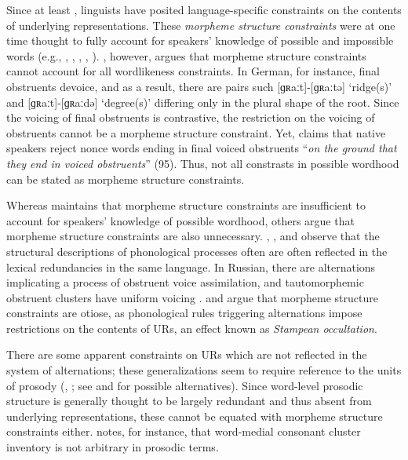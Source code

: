 \label{gaps} 


Since at least \citet{Pike1947b}, linguists have posited language-specific constraints on the contents of underlying representations.
These \emph{morpheme structure constraints} were at one time thought to fully account for speakers' knowledge of possible and impossible words (e.g., \citealt{Chomsky1965}, \citeyear[382]{SPE}, \citealt[22f.]{SPR}, \citeyear{Halle1962}, \citealt{Stanley1967}). 
\citet{Shibatani1973}, however, argues that morpheme structure constraints cannot account for all wordlikeness constraints.
In German, for instance, final obstruents devoice, and as a result, there are pairs such  [ɡʀaːt]-[ɡʀaːtə] `ridge(s)' and [ɡʀaːt]-[ɡʀaːdə] `degree(s)' differing only in the plural shape of the root.
Since the voicing of final obstruents is contrastive, the restriction on the voicing of obstruents cannot be a morpheme structure constraint. 
Yet, \citeauthor{Shibatani1973} claims that native speakers reject nonce words ending in final voiced obstruents ``\emph{on the ground that they end in voiced obstruents}'' (95). 
Thus, not all constrasts in possible wordhood can be stated as morpheme structure constraints.

Whereas \citeauthor{Shibatani1973} maintains that morpheme structure constraints are insufficient to account for speakers' knowledge of possible wordhood, others argue that morpheme structure constraints are also unnecessary. \citet[297]{Hale1965}, \citet{Kisseberth1970b}, and \citet[212f.]{Postal1968} observe that the structural descriptions of phonological processes often are often reflected in the lexical redundancies in the same language. In Russian, there are alternations implicating a process of obstruent voice assimilation, and tautomorphemic obstruent clusters have uniform voicing \citep[283]{A74}. \citet[205f.]{Dell1973} and \citet[28f.]{Stampe1973} argue that morpheme structure constraints are otiose, as phonological rules triggering alternations impose restrictions on the contents of URs, an effect known as \emph{Stampean occultation}.

There are some apparent constraints on URs which are not reflected in the system of alternations; these generalizations seem to require reference to the units of prosody (\citealt{Hooper1973}, \citealt{Kahn1976}; see \citealt{Blevins2003} and \citealt{Steriade1999} for possible alternatives). Since word-level prosodic structure is generally thought to be largely redundant and thus absent from underlying representations, these cannot be equated with morpheme structure constraints either. \citeauthor{Haugen1956} notes, for instance, that word-medial consonant cluster inventory is not arbitrary in prosodic terms.

